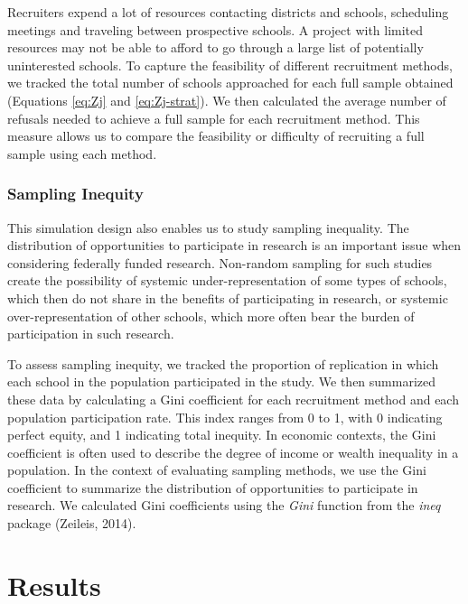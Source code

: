 \documentclass[
  english,
  man,floatsintext]{apa6}
\begin{document}
Recruiters expend a lot of resources contacting districts and schools, scheduling meetings and traveling between prospective schools. A project with limited resources may not be able to afford to go through a large list of potentially uninterested schools. To capture the feasibility of different recruitment methods, we tracked the total number of schools approached for each full sample obtained (Equations \eqref{eq:Zj} and \eqref{eq:Zj-strat}). We then calculated the average number of refusals needed to achieve a full sample for each recruitment method. This measure allows us to compare the feasibility or difficulty of recruiting a full sample using each method.

\hypertarget{sampling-inequity}{%
\subsubsection*{Sampling Inequity}\label{sampling-inequity}}

This simulation design also enables us to study sampling inequality. The distribution of opportunities to participate in research is an important issue when considering federally funded research.
Non-random sampling for such studies create the possibility of systemic under-representation of some types of schools, which then do not share in the benefits of participating in research, or systemic over-representation of other schools, which more often bear the burden of participation in such research.

To assess sampling inequity, we tracked the proportion of replication in which each school in the population participated in the study. We then summarized these data by calculating a Gini coefficient for each recruitment method and each population participation rate. This index ranges from 0 to 1, with 0 indicating perfect equity, and 1 indicating total inequity.
In economic contexts, the Gini coefficient is often used to describe the degree of income or wealth inequality in a population. In the context of evaluating sampling methods, we use the Gini coefficient to summarize the distribution of opportunities to participate in research. We calculated Gini coefficients using the \emph{Gini} function from the \emph{ineq} package (Zeileis, 2014).

\hypertarget{results}{%
\section*{Results}\label{results}}
\end{document}
